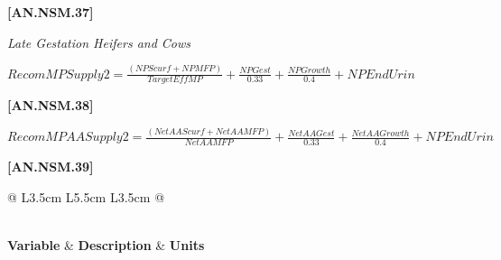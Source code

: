 \begin{refsection}
\begin{itemize}
\vspace{0.5cm}
            {\raggedleft \textbf{[AN.NSM.37]}\par}
            \vspace{0.5cm}
            
\textit{\small Late Gestation Heifers and Cows}
\vspace{0.2cm}

    \begin{center}
    \(RecomMPSupply2 =  \frac{(NPScurf + NPMFP)}{TargetEffMP} + \frac{NPGest}{0.33} + \frac{NPGrowth}{0.4} + NPEndUrin\)
    \end{center}

\vspace{0.5cm}
            {\raggedleft \textbf{[AN.NSM.38]}\par}
            \vspace{0.5cm}

    \begin{center}
    \(RecomMPAASupply2 =  \frac{(NetAAScurf + NetAAMFP)}{NetAAMFP} + \frac{NetAAGest}{0.33} + \frac{NetAAGrowth}{0.4} + NPEndUrin\)
    \end{center}

\vspace{0.5cm}
            {\raggedleft \textbf{[AN.NSM.39]}\par}
            \vspace{0.5cm}



\renewcommand{\arraystretch}{1.3}
\begin{longtable}{@{} L{3.5cm} L{5.5cm} L{3.5cm} @{}}
\caption{Key variables used in protein requirement calculations.} \\
\toprule
\textbf{Variable} & \textbf{Description} & \textbf{Units} \\
\midrule
\endfirsthead

 \\
\endfoot



\end{longtable}
\end{itemize}
\end{refsection}
